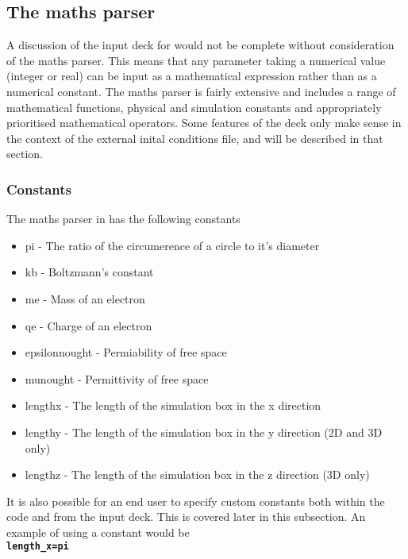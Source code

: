 \documentclass[12pt,a4paper]{article}
\newcommand{\inlinecode}[1]{{\color{warwickred} \bf\texttt{#1}}}
\newcommand{\EPOCH}{{\color{warwickdark}\fontfamily{phv}\selectfont{EPOCH}}}
\begin{document}
\subsection{The maths parser}
A discussion of the input deck for {\EPOCH} would not be complete without
consideration of the maths parser. This means that any parameter taking a
numerical value (integer or real) can be input as a mathematical expression
rather than as a numerical constant. The maths parser is fairly extensive and
includes a range of mathematical functions, physical and simulation constants
and appropriately prioritised mathematical operators. Some features of the
deck only make sense in the context of the external inital conditions file,
and will be described in that section.

\subsubsection{Constants}
The maths parser in {\EPOCH}  has the following constants
\begin{itemize}
\item pi - The ratio of the circumerence of a circle to it's diameter
\item kb - Boltzmann's constant
\item me - Mass of an electron
\item qe - Charge of an electron
\item epsilonnought - Permiability of free space
\item munought - Permittivity of free space
\item lengthx - The length of the simulation box in the x direction
\item lengthy - The length of the simulation box in the y direction (2D and 3D
  only)
\item lengthz - The length of the simulation box in the z direction (3D only)
\end{itemize}

It is also possible for an end user to specify custom constants both within
the code and from the input deck. This is covered later in this subsection. An
example of using a constant would be\\
\inlinecode{length\_x=pi}\\
\end{document}
